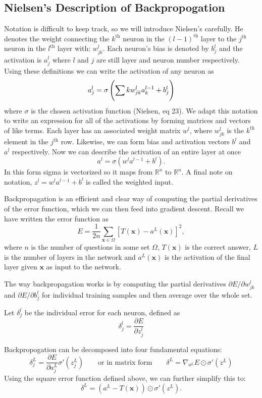 \documentclass[]{article}
\newcommand{\B}[1]{\boldsymbol{#1}}
\newcommand{\R}{\mathbb{R}}
\newcommand{\pd}{\partial}
\newcommand{\uth}{^{\text{th}}}
\theoremstyle{plain}
\theoremstyle{definition}
\begin{document}
\subsection{Nielsen's Description of Backpropogation}
Notation is difficult to keep track, so we will introduce Nielsen's carefully. He denotes the weight connecting the $ k\uth $ neuron in the $ (l-1)\uth $ layer to the $ j\uth $ neuron in the $ l\uth $ layer with:
$ w^l_{jk} $. Each neuron's bias is denoted by $ b_j^l $ and the activation is $ a_j^l $ where $ l $ and $ j $ are still layer and neuron number respectively. Using these definitions we can write the activation of any neuron as
\[ a^l_j = \sigma\left(\sum\limits_\textsl{}{k}w^l_{jk}a^{l-1}_k + b_j^l\right) \]
where $ \sigma $ is the chosen activation function (Nielsen, eq 23). We adapt this 
notation to write an expression for all of the activations by forming matrices and 
vectors of like terms. Each layer has an associated weight matrix $ w^l $, where $ 
w^l_{jk} $ is the $ k\uth $ element in the $ j\uth $ row. Likewise, we can form bias 
and activation vectors $ b^l $ and $ a^l $ respectively. Now we can describe the 
activation of an entire layer at once 
\[ a^l = \sigma(w^la^{l-1}+b^l). \]
In this form sigma is vectorized so it maps from $ \R^n $ to $ \R^n $. A final note on notation, $ z^l = w^la^{l-1}+b^l $ is called the weighted input. 

Backpropagation is an efficient and clear way of computing the partial derivatives of the error function, which we can then feed into gradient descent. Recall we have written the error function as 
\[ E = \frac{1}{2n}\sum\limits_{\B{x}\in\Omega}\left[T(\B{x}) - a^L(\B{x})\right]^2, \] 
where $ n $ is the number of questions in some set $ \Omega $, $ T(\B{x}) $ is the correct answer, $ L $ is the number of layers in the network and $ a^L(\B{x}) $ is the activation of the final layer given $ \B{x} $ as input to the network.

The way backpropagation works is by computing the partial derivatives $ \pd E/\pd w_{jk}^l $ and $ \pd E/\pd b_{j}^l $ for individual training samples and then average over the whole set. 

Let $ \delta_j^l $ be the individual error for each neuron, defined as
\[ \delta_j^l = \frac{\pd E}{\pd z^l_j} \]

Backpropogation can be decomposed into four fundamental equations:
\[ \delta^L_j = \frac{\pd E}{\pd a^L_j}\sigma'\left(z^L_j\right) \qquad \text{or in matrix form}\qquad \delta^L = \nabla_{a^L}E\odot\sigma'\left(z^L\right)\]
Using the square error function defined above, we can further simplify this to:
\[ \delta^L = (a^L - T(\B{x}))\odot\sigma'\left(z^L\right). \]
\end{document}

